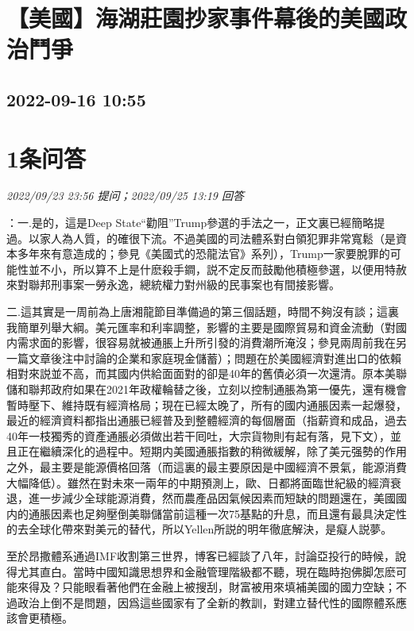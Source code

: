 \documentclass[twocolumn]{ctexart}
\begin{document}
\section{【美國】海湖莊園抄家事件幕後的美國政治鬥爭}
\subsection{2022-09-16 10:55}


\section{1条问答}

\textit{\hfill\noindent\small 2022/09/23 23:56 提问；2022/09/25 13:19 回答}

：一.是的，這是Deep State“勸阻”Trump參選的手法之一，正文裏已經簡略提過。以家人為人質，的確很下流。不過美國的司法體系對白領犯罪非常寬鬆（是資本多年來有意造成的；參見《美國式的恐龍法官》系列），Trump一家要脫罪的可能性並不小，所以算不上是什麽殺手鐧，説不定反而鼓勵他積極參選，以便用特赦來對聯邦刑事案一勞永逸，總統權力對州級的民事案也有間接影響。

二.這其實是一周前為上唐湘龍節目準備過的第三個話題，時間不夠沒有談；這裏我簡單列舉大綱。美元匯率和利率調整，影響的主要是國際貿易和資金流動（對國内需求面的影響，很容易就被通脹上升所引發的消費潮所淹沒；參見兩周前我在另一篇文章後注中討論的企業和家庭現金儲蓄）；問題在於美國經濟對進出口的依賴相對來説並不高，而其國内供給面面對的卻是40年的舊債必須一次還清。原本美聯儲和聯邦政府如果在2021年政權輪替之後，立刻以控制通脹為第一優先，還有機會暫時壓下、維持既有經濟格局；現在已經太晚了，所有的國内通脹因素一起爆發，最近的經濟資料都指出通脹已經普及到整體經濟的每個層面（指薪資和成品，過去40年一枝獨秀的資產通脹必須做出若干囘吐，大宗貨物則有起有落，見下文），並且正在繼續深化的過程中。短期内美國通脹指數的稍微緩解，除了美元强勢的作用之外，最主要是能源價格回落（而這裏的最主要原因是中國經濟不景氣，能源消費大幅降低）。雖然在對未來一兩年的中期預測上，歐、日都將面臨世紀級的經濟衰退，進一步減少全球能源消費，然而農產品因氣候因素而短缺的問題還在，美國國内的通脹因素也足夠壓倒美聯儲當前這種一次75基點的升息，而且還有最具決定性的去全球化帶來對美元的替代，所以Yellen所説的明年徹底解決，是癡人説夢。

至於昂撒體系通過IMF收割第三世界，博客已經談了八年，討論亞投行的時候，說得尤其直白。當時中國知識思想界和金融管理階級都不聽，現在臨時抱佛脚怎麽可能來得及？只能眼看著他們在金融上被搜刮，財富被用來填補美國的國力空缺；不過政治上倒不是問題，因爲這些國家有了全新的教訓，對建立替代性的國際體系應該會更積極。
\\
\end{document}
